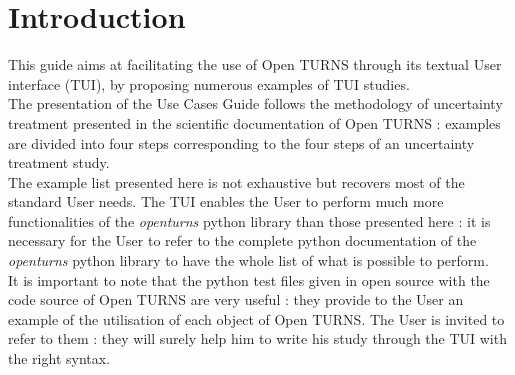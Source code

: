 



\newpage \section*{Introduction}



This guide aims at facilitating the use of Open TURNS through its textual User interface (TUI), by proposing numerous examples of TUI studies.\\

The presentation of the Use Cases Guide follows the methodology of uncertainty treatment presented in the scientific documentation of Open TURNS : examples are divided into four steps corresponding to the four steps of an uncertainty treatment study.\\


The example list presented here is not exhaustive but recovers most of the standard User needs. The TUI enables the User to perform much more functionalities of the \emph{openturns} python library than those  presented here : it is necessary for the User to refer to the complete python documentation of the \emph{openturns} python library to have  the whole list of what is possible to perform.\\

It is important to note that the python test files given in open source with the code source of Open TURNS  are very useful : they provide to the User an example of the utilisation of each object of Open TURNS. The User is invited to refer to them : they will surely help him to write his study through the TUI with the right syntax.\\








